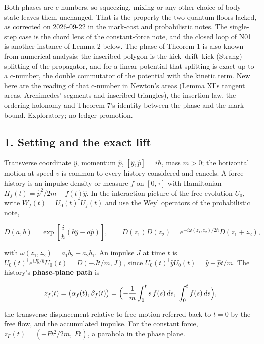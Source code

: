 \documentclass[11pt,a4paper]{article}
\begin{document}
Both phases are c-numbers, so squeezing, mixing or any other choice of
body state leaves them unchanged. That is the property the two quantum
floors lacked, as corrected on 2026-09-22 in the
\href{mark-cost-and-statistical-floor.md}{mark-cost} and
\href{planck-gap-probabilistic.md}{probabilistic} notes. The single-step
case is the chord lens of the
\href{principia-constant-force-action.md}{constant-force note}, and the
closed loop of \href{newton-insertion-action.md}{N01} is another
instance of Lemma 2 below. The phase of Theorem 1 is also known from
numerical analysis: the inscribed polygon is the kick--drift--kick
(Strang) splitting of the propagator, and for a linear potential that
splitting is exact up to a c-number, the double commutator of the
potential with the kinetic term. New here are the reading of that
c-number in Newton's areas (Lemma XI's tangent areas, Archimedes'
segments and inscribed triangles), the insertion law, the ordering
holonomy and Theorem 7's identity between the phase and the mark bound.
Exploratory; no ledger promotion.

\hypertarget{setting-and-the-exact-lift}{%
\subsection{1. Setting and the exact
lift}\label{setting-and-the-exact-lift}}

Transverse coordinate \(\hat y\), momentum \(\hat p\),
\([\hat y,\hat p]=i\hbar\), mass \(m>0\); the horizontal motion at speed
\(v\) is common to every history considered and cancels. A force history
is an impulse density or measure \(f\) on \([0,\tau]\) with Hamiltonian
\(H_f(t)=\hat p^2/2m-f(t)\hat y\). In the interaction picture of the
free evolution \(U_0\), write \(W_f(t)=U_0(t)^\dagger U_f(t)\) and use
the Weyl operators of the probabilistic note,

\[D(a,b)=\exp\!\left[\frac{i}{\hbar}(b\hat y-a\hat p)\right],\qquad
D(z_1)D(z_2)=e^{-i\omega(z_1,z_2)/2\hbar}D(z_1+z_2),\]

with \(\omega(z_1,z_2)=a_1b_2-a_2b_1\). An impulse \(J\) at time \(t\)
is \(U_0(t)^\dagger e^{iJ\hat y/\hbar}U_0(t)=D(-Jt/m,J)\), since
\(U_0(t)^\dagger\hat yU_0(t)=\hat y+\hat pt/m\). The history's
\textbf{phase-plane path} is

\[z_f(t)=\bigl(\alpha_f(t),\beta_f(t)\bigr)
=\Bigl(-\frac1m\int_0^ts\,f(s)\,ds,\ \int_0^tf(s)\,ds\Bigr),\]

the transverse displacement relative to free motion referred back to
\(t=0\) by the free flow, and the accumulated impulse. For the constant
force, \(z_F(t)=(-Ft^2/2m,\ Ft)\), a parabola in the phase plane.
\end{document}
